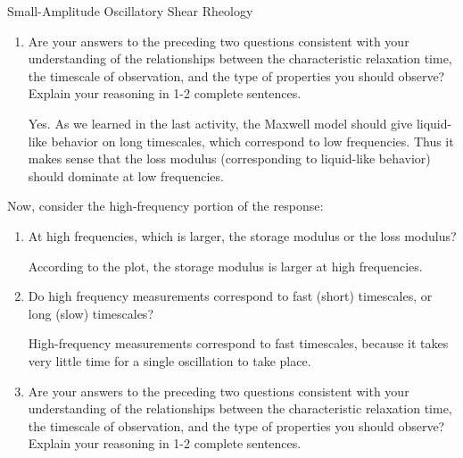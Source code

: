 \begin{activity}[extension]{Small-Amplitude Oscillatory Shear Rheology}
\begin{ctqs}
\begin{enumerate}
\begin{solution}[1in]{}
				\end{solution}
					
			\item Are your answers to the preceding two questions consistent with your understanding of the relationships between the characteristic relaxation time, the timescale of observation, and the type of properties you should observe?  Explain your reasoning in 1-2 complete sentences.
			
				\begin{solution}[2in]{}
				
					Yes. As we learned in the last activity, the Maxwell model should give liquid-like behavior on long timescales, which correspond to low frequencies.  Thus it makes sense that the loss modulus (corresponding to liquid-like behavior) should dominate at low frequencies.
				
				\end{solution}
	
		\end{enumerate}
	
	\question Now, consider the high-frequency portion of the response:
	
		\begin{enumerate}
		
			\item At high frequencies, which is larger, the storage modulus or the loss modulus?
	
					\begin{solution}[1in]{}
					
						According to the plot, the storage modulus is larger at high frequencies.
					
					\end{solution}
					
			\item Do high frequency measurements correspond to fast (short) timescales, or long (slow) timescales?
			
				\begin{solution}[1in]{}
				
					High-frequency measurements correspond to fast timescales, because it takes very little time for a single oscillation to take place.
				
				\end{solution}
					
			\item Are your answers to the preceding two questions consistent with your understanding of the relationships between the characteristic relaxation time, the timescale of observation, and the type of properties you should observe?  Explain your reasoning in 1-2 complete sentences.
			

\end{enumerate}
\end{ctqs}
\end{activity}
